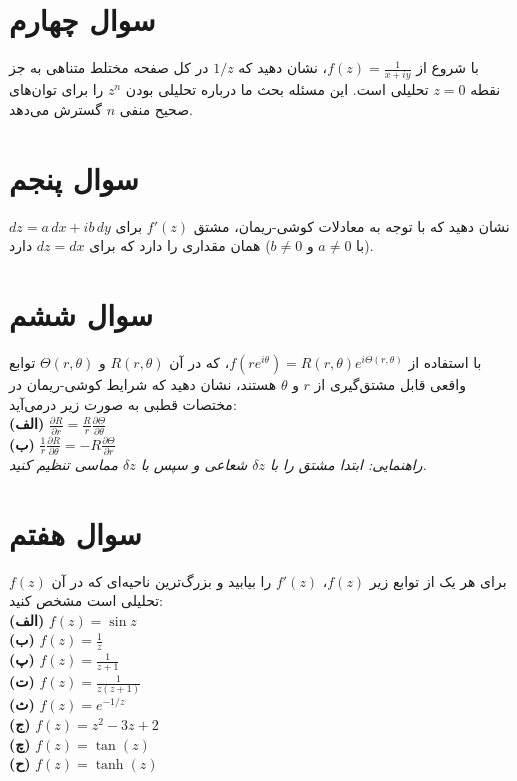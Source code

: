\documentclass[a4paper,16pt]{article}
\begin{document}
	\section{سوال چهارم}
	با شروع از \( f(z) = \frac{1}{x + iy} \)، نشان دهید که \( 1/z \) در کل صفحه مختلط متناهی به جز نقطه \( z = 0 \) تحلیلی است. این مسئله بحث ما درباره تحلیلی بودن \( z^n \) را برای توان‌های صحیح منفی \( n \) گسترش می‌دهد.
	\section{سوال پنجم}
	نشان دهید که با توجه به معادلات کوشی-ریمان، مشتق \( f'(z) \) برای \( dz = a\, dx + i b\, dy \) (با \( a \neq 0 \) و \( b \neq 0 \)) همان مقداری را دارد که برای \( dz = dx \) دارد.
	
	\section{سوال ششم}
	با استفاده از \( f(r e^{i\theta}) = R(r,\theta)e^{i\Theta(r,\theta)} \)، که در آن \( R(r,\theta) \) و \( \Theta(r,\theta) \) توابع واقعی قابل مشتق‌گیری از \( r \) و \( \theta \) هستند، نشان دهید که شرایط کوشی-ریمان در مختصات قطبی به صورت زیر درمی‌آید:  
	\\
	\textbf{(الف)} \( \frac{\partial R}{\partial r} = \frac{R}{r} \frac{\partial \Theta}{\partial \theta} \)  
	\\
	\textbf{(ب)} \( \frac{1}{r}\frac{\partial R}{\partial \theta} = -R \frac{\partial \Theta}{\partial r} \)  
	\\
	\textit{راهنمایی: ابتدا مشتق را با \(\delta z\) شعاعی و سپس با \(\delta z\) مماسی تنظیم کنید.}
	
	
	\section{سوال هفتم}
	برای هر یک از توابع زیر \( f(z) \)، \( f'(z) \) را بیابید و بزرگ‌ترین ناحیه‌ای که در آن \( f(z) \) تحلیلی است مشخص کنید: 
	\\ 
	\textbf{(الف)} \( f(z) = \sin z \)  
	\\
	\textbf{(ب)} \( f(z) = \frac{1}{z} \)  
	\\
	\textbf{(پ)} \( f(z) = \frac{1}{z+1} \) 
	\\ 
	\textbf{(ت)} \( f(z) = \frac{1}{z(z+1)} \) 
	\\ 
	\textbf{(ث)} \( f(z) = e^{-1/z} \)  
	\\
	\textbf{(ج)} \( f(z) = z^2 - 3z + 2 \)  
	\\
	\textbf{(چ)} \( f(z) = \tan(z) \)  
	\\
	\textbf{(ح)} \( f(z) = \tanh(z) \)
\end{document}

